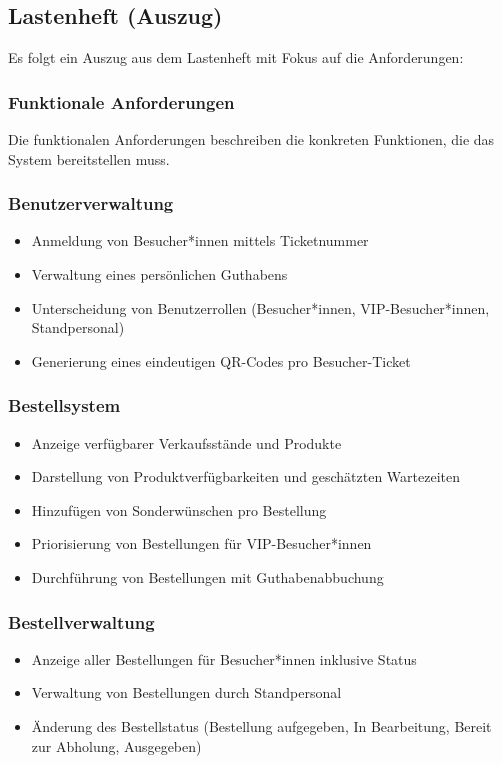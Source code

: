 \subsection{Lastenheft (Auszug)}
\label{app:Lastenheft}
Es folgt ein Auszug aus dem Lastenheft mit Fokus auf die Anforderungen:

\subsubsection{Funktionale Anforderungen}
\label{sec:FunktionaleAnforderungen}
Die funktionalen Anforderungen beschreiben die konkreten Funktionen, die das System bereitstellen muss.

\subsubsection*{Benutzerverwaltung}
\begin{itemize}
    \item Anmeldung von Besucher*innen mittels Ticketnummer
    \item Verwaltung eines persönlichen Guthabens
    \item Unterscheidung von Benutzerrollen (Besucher*innen, \acs{VIP}-Besucher*innen, Standpersonal)
    \item Generierung eines eindeutigen \acs{QR}-Codes pro Besucher-Ticket
\end{itemize}

\subsubsection*{Bestellsystem}
\begin{itemize}
    \item Anzeige verfügbarer Verkaufsstände und Produkte
    \item Darstellung von Produktverfügbarkeiten und geschätzten Wartezeiten
    \item Hinzufügen von Sonderwünschen pro Bestellung
    \item Priorisierung von Bestellungen für \acs{VIP}-Besucher*innen
    \item Durchführung von Bestellungen mit Guthabenabbuchung
\end{itemize}

\subsubsection*{Bestellverwaltung}
\begin{itemize}
    \item Anzeige aller Bestellungen für Besucher*innen inklusive Status
    \item Verwaltung von Bestellungen durch Standpersonal
    \item Änderung des Bestellstatus (Bestellung aufgegeben, In Bearbeitung, Bereit zur Abholung, Ausgegeben)
\end{itemize}

